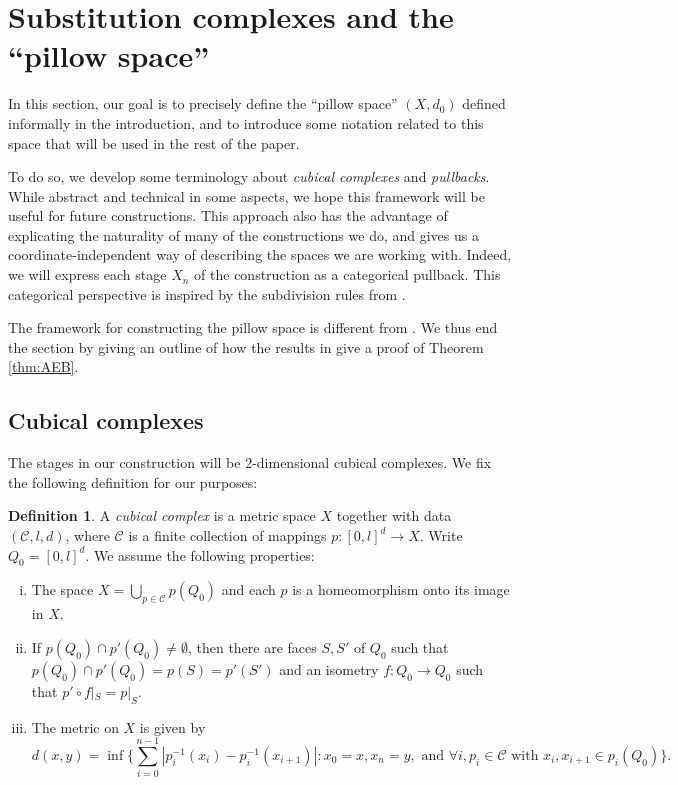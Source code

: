 \documentclass{amsart}
\theoremstyle{plain}
\theoremstyle{definition}
\newtheorem{definition}[theorem]{Definition}
\numberwithin{equation}{section}
\numberwithin{theorem}{section}
\newcommand{\cC}{\mathcal{C}}
\begin{document}
\section{Substitution complexes and the ``pillow space''}\label{sec:cubical}
In this section, our goal is to precisely define the ``pillow space'' $(X,d_0)$ defined informally in the introduction, and to introduce some notation related to this space that will be used in the rest of the paper. 


To do so, we develop some terminology about \emph{cubical complexes} and \emph{pullbacks}. While abstract and technical in some aspects, we hope this framework will be useful for future constructions. This approach also has the advantage of explicating the naturality of many of the constructions we do, and gives us a coordinate-independent way of describing the spaces we are working with. Indeed, we will express each stage $X_n$ of the construction as a categorical pullback. This categorical perspective is inspired by the subdivision rules from \cite{CFP}.

The framework for constructing the pillow space is different from \cite[Example 4.3]{AEBb}. We thus end the section by giving an outline of how the results in \cite{AEBb} give a proof of Theorem \ref{thm:AEB}.
\subsection{Cubical complexes}

The stages in our construction will be $2$-dimensional cubical complexes. We fix the following definition for our purposes:

\begin{definition}
A \emph{cubical complex} is a metric space $X$ together with data $(\cC, l,d)$, where $\cC$ is a finite collection of mappings $p:[0,l]^d\to X$. Write $Q_0=[0,l]^d$. We assume the following properties: 
\begin{enumerate}[(i)]
    \item The space $X= \bigcup_{p\in \cC} p(Q_0)$ and each $p$ is a homeomorphism onto its image in $X$.
    \item If  $p(Q_0)\cap p'(Q_0)\neq \emptyset$, then there are faces $S,S'$ of $Q_0$ such that $p(Q_0)\cap p'(Q_0)=p(S)=p'(S')$ and an isometry $f:Q_0\to Q_0$ such that $p'\circ f|_S=p|_S$.
    \item The metric on $X$ is given by
\begin{equation}\label{eq:cubemetric}
d(x,y)=\inf \{\sum_{i=0}^{n-1} |p_i^{-1}(x_i) - p_i^{-1}(x_{i+1})| : x_0 = x, x_n = y, \text{ and } \forall i, p_i\in\cC \text{ with }x_i,x_{i+1}\in p_{i}(Q_0)\}.
\end{equation}

\end{enumerate} 
\end{definition}
\end{document}
